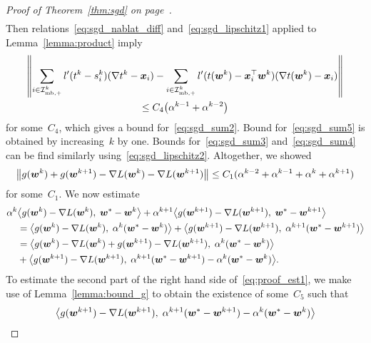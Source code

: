\begin{proof}[Proof of Theorem~\ref{thm:sgd} on page~\pageref{thm:sgd}]
\begin{subequations}
\begin{align}
    \end{align}
  \end{subequations}
  Then relations~\eqref{eq:sgd_nablat_diff} and~\eqref{eq:sgd_lipschitz1} applied to Lemma~\ref{lemma:product} imply
  \begin{multline*}
    \norm{\sum_{i \in \Imbpos^k} l'(t^k - s_i^k)(\nabla t^k - \bm{x}_i) - \sum_{i \in \Imbpos^k} l'(t(\bm{w}^k) - \bm{x}_i^\top \bm{w}^k)(\nabla t(\bm{w}^k) - \bm{x}_i)}\\
      \leq C_4 \Brac{\alpha^{k-1} + \alpha^{k-2}}
  \end{multline*}
  for some~$C_4$, which gives a bound for~\eqref{eq:sgd_sum2}. Bound for~\eqref{eq:sgd_sum5} is obtained by increasing~$k$ by one. Bounds for~\eqref{eq:sgd_sum3} and~\eqref{eq:sgd_sum4} can be find similarly using~\eqref{eq:sgd_lipschitz2}. Altogether, we showed
  \begin{equation}\label{eq:nec_cond3}
    \norm{g(\bm{w}^k) + g(\bm{w}^{k+1}) - \nabla L(\bm{w}^k) - \nabla L(\bm{w}^{k+1})}
      \leq C_1(\alpha^{k-2} + \alpha^{k-1} + \alpha^{k} + \alpha^{k+1})
  \end{equation}
  for some~$C_1$. We now estimate
  \begin{equation}\label{eq:proof_est1}
    \begin{aligned}
      \alpha^k
      & \inner{ g(\bm{w}^{k})-\nabla L(\bm{w}^{k})}{\bm{w}^*-\bm{w}^{k}} + \alpha^{k+1}\inner{ g(\bm{w}^{k+1})-\nabla L(\bm{w}^{k+1})}{\bm{w}^*-\bm{w}^{k+1}} \\
      & = \inner{ g(\bm{w}^{k})-\nabla L(\bm{w}^{k})}{\alpha^k(\bm{w}^*-\bm{w}^{k})}
        + \inner{ g(\bm{w}^{k+1})-\nabla L(\bm{w}^{k+1})}{\alpha^{k+1}(\bm{w}^*-\bm{w}^{k+1})} \\
      & = \inner{ g(\bm{w}^{k})-\nabla L(\bm{w}^{k}) + g(\bm{w}^{k+1})-\nabla L(\bm{w}^{k+1})}{\alpha^k(\bm{w}^*-\bm{w}^{k})} \\
      & + \inner{ g(\bm{w}^{k+1})-\nabla L(\bm{w}^{k+1})}{\alpha^{k+1}(\bm{w}^*-\bm{w}^{k+1})-\alpha^k(\bm{w}^*-\bm{w}^{k})}.
    \end{aligned}
  \end{equation}
  To estimate the second part of the right hand side of~\eqref{eq:proof_est1}, we make use of Lemma~\ref{lemma:bound_g} to obtain the existence of some~$C_5$ such that
  \begin{equation}\label{eq:proof_est2}
    \begin{aligned}
    & \inner{ g(\bm{w}^{k+1})
    -\nabla L(\bm{w}^{k+1})}{\alpha^{k+1}(\bm{w}^*-\bm{w}^{k+1})-\alpha^k(\bm{w}^*-\bm{w}^{k})} \\

\end{aligned}
\end{equation}
\end{proof}

